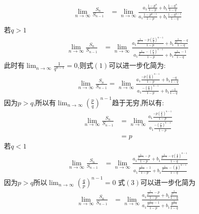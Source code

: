 \begin{questions}
	\begin{solution}
		\begin{align*}
			\lim_{n\to\infty}\frac{S_n}{S_{n-1}}
			 & = \lim_{n\to\infty}\frac{a_1\frac{1-p^n}{1-p}+b_1\frac{1-q^n}{1-q}}{a_1\frac{1-p^{n-1}}{1-p}+b_1\frac{1-q^{n-1}}{1-q}} \\
		\end{align*}
		若$q>1$
		\begin{align*}
			\lim_{n\to\infty}\frac{S_n}{S_{n-1}}
			 & =\lim_{n\to\infty}\frac{a_1\frac{\frac{1}{q^{n-1}}- p\left( \frac{p}{q} \right)^{n-1}}{1-p} +
				b_1\frac{\frac{1}{q{n-1}}-q}{1-q}}
			{a_1\frac{\frac{1}{q^{n-1}}- \left( \frac{p}{q} \right)^{n-1}}{1-p} + b_1\frac{\frac{1}{q^{n-1}}-1}{1-q}}
			\tag{1}
		\end{align*}
		此时有$\displaystyle\lim_{n\to\infty}\frac{1}{q^{n-1}}=0$,则式$(1)$可以进一步化简为:
		\begin{align*}
			\lim_{n\to\infty}\frac{S_n}{S_{n-1}} = \lim_{n\to\infty}\frac{a_1\frac{-p \left( \frac{p}{q}
					\right)^{n-1}}{1-p} + b_1\frac{-q}{1-q}}
			{a_1\frac{-\left( \frac{p}{q} \right)^{n-1}}{1-p} + b_1\frac{-1}{1-q}}
		\end{align*}
		因为$p>q$,所以有$\displaystyle\lim_{n\to\infty}\left( \frac{p}{q} \right)^{n-1}$趋于无穷,所以有:
		\begin{align*}
			\lim_{n\to\infty}\frac{S_n}{S_{n-1}} & = \lim_{n\to\infty}\frac{a_1\frac{-p \left( \frac{p}{q}
			\right)^{n-1}}{1-p}}{a_1\frac{-\left( \frac{p}{q}\right)^{n-1}}{1-p}}                          \\
			                                     & = p
		\end{align*}
		若$q<1$
		\begin{align*}
			\lim_{n\to\infty}\frac{S_n}{S_{n-1}}
			 & = \lim_{n\to\infty}\frac{a_1\frac{\frac{1}{p^{n-1}}-p}{1-p} + b_1\frac{\frac{1}{p^{n-1}}-q \left(
					\frac{q}{p} \right)^{n-1}}{1-q}}
			{a_1\frac{\frac{1}{p^{n-1}}-1}{1-p} + b_1\frac{\frac{1}{p^{n-1}}- \left( \frac{q}{p} \right)^{n-1}}{1-q}}
			\tag{3}
		\end{align*}
		因为$p> q$所以$\displaystyle\lim_{n\to\infty}\left(  \frac{q}{p}\right)^{n-1} = 0$
		式$(3)$可以进一步化简为
		\begin{align*}
			\lim_{n\to\infty}\frac{S_n}{S_{n-1}} & =
			\lim_{n\to\infty}\frac{a_1\frac{\frac{1}{p^{n-1}}-p}{1-p}+b_1\frac{\frac{1}{p^{n-1}}}{1-q}}
			{a_1\frac{\frac{1}{p^{n-1}}-1}{1-p} + b_1\frac{\frac{1}{p^{n-1}}}{1-q}} \tag{4}
		\end{align*}

\end{solution}
\end{questions}

